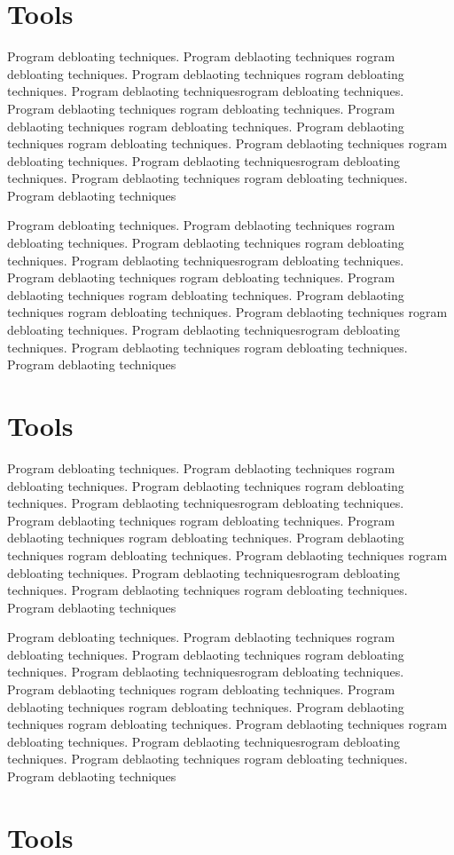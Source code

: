 \documentclass{relatorio}
\begin{document}
	\section{Tools}%
\label{Tools}

Program debloating techniques. Program deblaoting techniques rogram debloating techniques. Program deblaoting techniques
rogram debloating techniques. Program deblaoting techniquesrogram debloating techniques. Program deblaoting techniques
rogram debloating techniques. Program deblaoting techniques rogram debloating techniques. Program deblaoting techniques
rogram debloating techniques. Program deblaoting techniques 
rogram debloating techniques. Program deblaoting techniquesrogram debloating techniques. Program deblaoting techniques
rogram debloating techniques. Program deblaoting techniques

Program debloating techniques. Program deblaoting techniques rogram debloating techniques. Program deblaoting techniques
rogram debloating techniques. Program deblaoting techniquesrogram debloating techniques. Program deblaoting techniques
rogram debloating techniques. Program deblaoting techniques rogram debloating techniques. Program deblaoting techniques
rogram debloating techniques. Program deblaoting techniques 
rogram debloating techniques. Program deblaoting techniquesrogram debloating techniques. Program deblaoting techniques
rogram debloating techniques. Program deblaoting techniques

\section{Tools}%
\label{Tools}

Program debloating techniques. Program deblaoting techniques rogram debloating techniques. Program deblaoting techniques
rogram debloating techniques. Program deblaoting techniquesrogram debloating techniques. Program deblaoting techniques
rogram debloating techniques. Program deblaoting techniques rogram debloating techniques. Program deblaoting techniques
rogram debloating techniques. Program deblaoting techniques 
rogram debloating techniques. Program deblaoting techniquesrogram debloating techniques. Program deblaoting techniques
rogram debloating techniques. Program deblaoting techniques

Program debloating techniques. Program deblaoting techniques rogram debloating techniques. Program deblaoting techniques
rogram debloating techniques. Program deblaoting techniquesrogram debloating techniques. Program deblaoting techniques
rogram debloating techniques. Program deblaoting techniques rogram debloating techniques. Program deblaoting techniques
rogram debloating techniques. Program deblaoting techniques 
rogram debloating techniques. Program deblaoting techniquesrogram debloating techniques. Program deblaoting techniques
rogram debloating techniques. Program deblaoting techniques	\section{Tools}%
\label{Tools}
\end{document}
